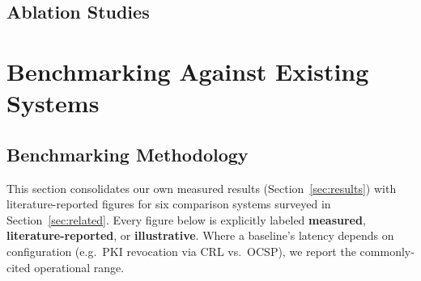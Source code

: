 \documentclass[journal,twoside,10pt]{IEEEtran}
\begin{document}
\subsection{Ablation Studies}
\begin{table}[!t]
\renewcommand{\arraystretch}{1.2}
\caption{Ablation: Merkle Tree Depth vs.\ Proving Cost, with the
corresponding collision-term contribution from Theorem~\ref{thm:disclosure}.}
\label{tab:ablation_merkle}
\centering
{}
\end{table}

\begin{table}[!t]
\renewcommand{\arraystretch}{1.2}
\caption{Ablation: LSTM Window Size Tradeoffs.}
\label{tab:ablation_lstm}
\centering
{}
\end{table}

\section{Benchmarking Against Existing Systems}
\label{sec:benchmark}

\subsection{Benchmarking Methodology}
This section consolidates our own measured results (Section~\ref{sec:results})
with literature-reported figures for six comparison systems surveyed in
Section~\ref{sec:related}. Every figure below is explicitly labeled
\textbf{measured}, \textbf{literature-reported}, or \textbf{illustrative}.
Where a baseline's latency depends on configuration (e.g.\ PKI revocation
via CRL vs.\ OCSP), we report the commonly-cited operational range.
\end{document}
